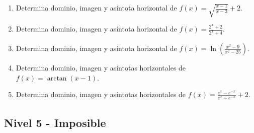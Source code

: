 \documentclass[11pt,a4paper]{article}
\begin{document}
\begin{enumerate}[label=\textbf{E\arabic*.},start=61]
\item Determina dominio, imagen y asíntota horizontal de $f(x)=\sqrt{\frac{x-1}{x-3}}+2$.

\item Determina dominio, imagen y asíntota horizontal de $f(x)=\frac{2^x+2}{2^x+4}$. 

\item Determina dominio, imagen y asíntota horizontal de $f(x)=\ln\left(\frac{x^2-9}{x^2-25}\right)$.

\item Determina dominio, imagen y asíntotas horizontales de $f(x)=\arctan(x-1)$.

\item Determina dominio, imagen y asíntotas horizontales de $f(x)=\frac{e^x-e^{-x}}{e^x+e^{-x}}+2$.

\end{enumerate}

\newpage

\subsection{Nivel 5 - Imposible}
\end{document}
